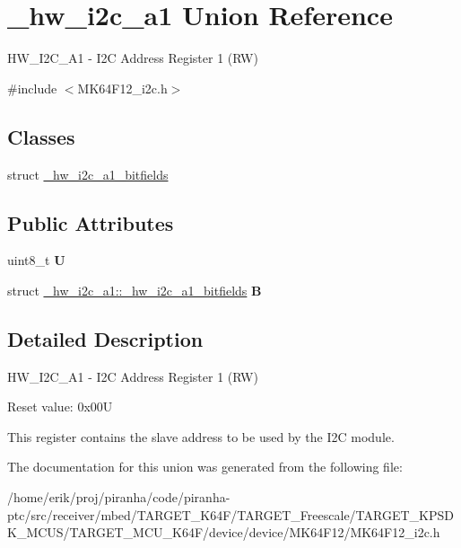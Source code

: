 \hypertarget{union__hw__i2c__a1}{}\section{\+\_\+hw\+\_\+i2c\+\_\+a1 Union Reference}
\label{union__hw__i2c__a1}


H\+W\+\_\+\+I2\+C\+\_\+\+A1 -\/ I2C Address Register 1 (RW)  




{\ttfamily \#include $<$M\+K64\+F12\+\_\+i2c.\+h$>$}

\subsection*{Classes}
\begin{DoxyCompactItemize}
\item 
struct \hyperlink{struct__hw__i2c__a1_1_1__hw__i2c__a1__bitfields}{\+\_\+hw\+\_\+i2c\+\_\+a1\+\_\+bitfields}
\end{DoxyCompactItemize}
\subsection*{Public Attributes}
\begin{DoxyCompactItemize}
\item 
uint8\+\_\+t {\bfseries U}\hypertarget{union__hw__i2c__a1_afa0ea6d5e475e303524ae35feecd924f}{}\label{union__hw__i2c__a1_afa0ea6d5e475e303524ae35feecd924f}

\item 
struct \hyperlink{struct__hw__i2c__a1_1_1__hw__i2c__a1__bitfields}{\+\_\+hw\+\_\+i2c\+\_\+a1\+::\+\_\+hw\+\_\+i2c\+\_\+a1\+\_\+bitfields} {\bfseries B}\hypertarget{union__hw__i2c__a1_a2f467356507a8c1a723a635c6fdf8ccb}{}\label{union__hw__i2c__a1_a2f467356507a8c1a723a635c6fdf8ccb}

\end{DoxyCompactItemize}


\subsection{Detailed Description}
H\+W\+\_\+\+I2\+C\+\_\+\+A1 -\/ I2C Address Register 1 (RW) 

Reset value\+: 0x00U

This register contains the slave address to be used by the I2C module. 

The documentation for this union was generated from the following file\+:\begin{DoxyCompactItemize}
\item 
/home/erik/proj/piranha/code/piranha-\/ptc/src/receiver/mbed/\+T\+A\+R\+G\+E\+T\+\_\+\+K64\+F/\+T\+A\+R\+G\+E\+T\+\_\+\+Freescale/\+T\+A\+R\+G\+E\+T\+\_\+\+K\+P\+S\+D\+K\+\_\+\+M\+C\+U\+S/\+T\+A\+R\+G\+E\+T\+\_\+\+M\+C\+U\+\_\+\+K64\+F/device/device/\+M\+K64\+F12/M\+K64\+F12\+\_\+i2c.\+h\end{DoxyCompactItemize}

